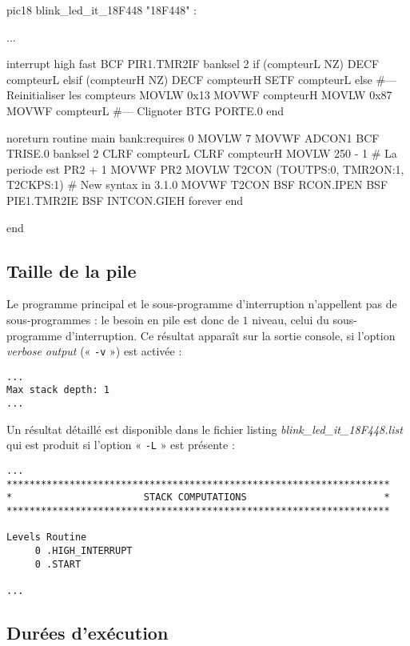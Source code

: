 \begin{piccolo}
pic18 blink_led_it_18F448 "18F448" :

...

interrupt high fast {
  BCF  PIR1.TMR2IF
  banksel 2
  if (compteurL NZ)
    DECF compteurL
  elsif (compteurH NZ)
    DECF compteurH
    SETF compteurL
  else
  #--- Reinitialiser les compteurs
    MOVLW  0x13
    MOVWF  compteurH
    MOVLW  0x87
    MOVWF  compteurL
  #--- Clignoter
    BTG  PORTE.0
  end
}

noreturn routine main bank:requires 0 {
  MOVLW 7
  MOVWF ADCON1
  BCF  TRISE.0
  banksel 2
  CLRF compteurL
  CLRF compteurH
  MOVLW  250 - 1 # La periode est PR2 + 1
  MOVWF  PR2
  MOVLW  T2CON (TOUTPS:0, TMR2ON:1, T2CKPS:1) # New syntax in 3.1.0
  MOVWF  T2CON  
  BSF  RCON.IPEN
  BSF  PIE1.TMR2IE
  BSF  INTCON.GIEH
  forever
  end
}

end
\end{piccolo}


\subsection{Taille de la pile}

Le programme principal et le sous-programme d'interruption n'appellent pas de sous-programmes : le besoin en pile est donc de $1$ niveau, celui du sous-programme d'interruption. Ce résultat apparaît sur la sortie console, si l'option \emph{verbose output} (« \texttt{-v} ») est activée :

\begin{lstlisting}[language=assembleur]
...
Max stack depth: 1
...
\end{lstlisting}

Un résultat détaillé est disponible dans le fichier listing \emph{blink\_led\_it\_18F448.list} qui est produit si l'option « \texttt{-L} » est présente :

\begin{lstlisting}[language=assembleur]
...
*******************************************************************
*                       STACK COMPUTATIONS                        *
*******************************************************************

Levels Routine
     0 .HIGH_INTERRUPT
     0 .START

...
\end{lstlisting}



\subsection{Durées d'exécution}


